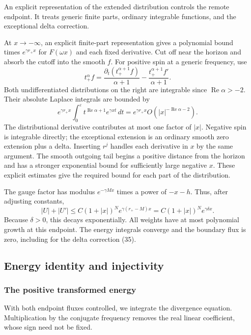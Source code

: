 \documentclass[11pt,a4paper]{article}
\begin{document}
An explicit representation of the extended distribution controls the remote endpoint. It treats generic finite parts, ordinary integrable functions, and the exceptional delta correction.

At \(x\to-\infty\), an explicit finite-part representation gives a
polynomial bound times \(e^{\gamma r_+x}\) for \(F(\omega x)\) and each
fixed derivative. Cut off near the horizon and absorb the cutoff into
the smooth \(f\). For positive spin at a generic frequency, use \[
 t_+^\alpha f=
 \frac{\partial_t(t_+^{\alpha+1}f)}{\alpha+1}
 -\frac{t_+^{\alpha+1}f'}{\alpha+1}.
 \tag{48a}
\] Both undifferentiated distributions on the right are integrable since
\(\operatorname{Re}\alpha>-2\). Their absolute Laplace integrals are
bounded by \[
 e^{\gamma r_+x}
 \int_0^\varepsilon t^{\operatorname{Re}\alpha+1}
             e^{\gamma xt}\,dt
 =e^{\gamma r_+x}O(|x|^{-\operatorname{Re}\alpha-2}).
\] The distributional derivative contributes at most one factor of
\(|x|\). Negative spin is integrable directly; the exceptional extension
is an ordinary smooth zero extension plus a delta. Inserting \(r^j\)
handles each derivative in \(x\) by the same argument. The smooth
outgoing tail begins a positive distance from the horizon and has a
stronger exponential bound for sufficiently large negative \(x\). These explicit estimates give the required bound for each part of the distribution.

The gauge factor has modulus \(e^{-\gamma Mx}\) times a power of
\(-x-h\). Thus, after adjusting constants, \[
 |U|+|U'|\le C(1+|x|)^N e^{\gamma(r_+-M)x}
          =C(1+|x|)^N e^{\gamma\delta x}.
 \tag{48}
\] Because \(\delta>0\), this decays exponentially. All weights have at
most polynomial growth at this endpoint. The energy integrals converge
and the boundary flux is zero, including for the delta correction (35).

\subsection{Energy identity and
injectivity}\label{energy-identity-and-injectivity}

\subsubsection{The positive transformed energy}\label{readable-energy-identity}

With both endpoint fluxes controlled, we integrate the divergence equation. Multiplication by the conjugate frequency removes the real linear coefficient, whose sign need not be fixed.
\end{document}
